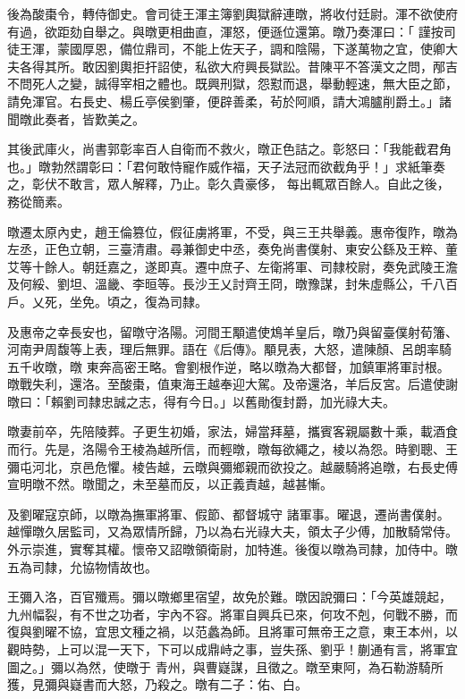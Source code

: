\begin{pinyinscope}
 後為酸棗令，轉侍御史。會司徒王渾主簿劉輿獄辭連暾，將收付廷尉。渾不欲使府有過，欲距劾自舉之。與暾更相曲直，渾怒，便遜位還第。暾乃奏渾曰：「
 謹按司徒王渾，蒙國厚恩，備位鼎司，不能上佐天子，調和陰陽，下遂萬物之宜，使卿大夫各得其所。敢因劉輿拒扞詔使，私欲大府興長獄訟。昔陳平不答漢文之問，邴吉不問死人之變，誠得宰相之體也。既興刑獄，怨懟而退，舉動輕速，無大臣之節，請免渾官。右長史、楊丘亭侯劉肇，便辟善柔，茍於阿順，請大鴻臚削爵土。」諸聞暾此奏者，皆歎美之。



 其後武庫火，尚書郭彰率百人自衛而不救火，暾正色詰之。彰怒曰：「我能截君角也。」暾勃然謂彰曰：「君何敢恃寵作威作福，天子法冠而欲截角乎！」求紙筆奏之，彰伏不敢言，眾人解釋，乃止。彰久貴豪侈，
 每出輒眾百餘人。自此之後，務從簡素。



 暾遷太原內史，趙王倫篡位，假征虜將軍，不受，與三王共舉義。惠帝復阼，暾為左丞，正色立朝，三臺清肅。尋兼御史中丞，奏免尚書僕射、東安公繇及王粹、董艾等十餘人。朝廷嘉之，遂即真。遷中庶子、左衛將軍、司隸校尉，奏免武陵王澹及何綏、劉坦、溫畿、李晅等。長沙王乂討齊王冏，暾豫謀，封朱虛縣公，千八百戶。乂死，坐免。頃之，復為司隸。



 及惠帝之幸長安也，留暾守洛陽。河間王顒遣使鴆羊皇后，暾乃與留臺僕射荀籓、河南尹周馥等上表，理后無罪。語在《后傳》。顒見表，大怒，遣陳顏、呂朗率騎五千收暾，暾
 東奔高密王略。會劉根作逆，略以暾為大都督，加鎮軍將軍討根。暾戰失利，還洛。至酸棗，值東海王越奉迎大駕。及帝還洛，羊后反宮。后遣使謝暾曰：「賴劉司隸忠誠之志，得有今日。」以舊勛復封爵，加光祿大夫。



 暾妻前卒，先陪陵葬。子更生初婚，家法，婦當拜墓，攜賓客親屬數十乘，載酒食而行。先是，洛陽令王棱為越所信，而輕暾，暾每欲繩之，棱以為怨。時劉聰、王彌屯河北，京邑危懼。棱告越，云暾與彌鄉親而欲投之。越嚴騎將追暾，右長史傅宣明暾不然。暾聞之，未至墓而反，以正義責越，越甚慚。



 及劉曜寇京師，以暾為撫軍將軍、假節、都督城守
 諸軍事。曜退，遷尚書僕射。越憚暾久居監司，又為眾情所歸，乃以為右光祿大夫，領太子少傅，加散騎常侍。外示崇進，實奪其權。懷帝又詔暾領衛尉，加特進。後復以暾為司隸，加侍中。暾五為司隸，允協物情故也。



 王彌入洛，百官殲焉。彌以暾鄉里宿望，故免於難。暾因說彌曰：「今英雄競起，九州幅裂，有不世之功者，宇內不容。將軍自興兵已來，何攻不剋，何戰不勝，而復與劉曜不協，宜思文種之禍，以范蠡為師。且將軍可無帝王之意，東王本州，以觀時勢，上可以混一天下，下可以成鼎峙之事，豈失孫、劉乎！蒯通有言，將軍宜圖之。」彌以為然，使暾于
 青州，與曹嶷謀，且徵之。暾至東阿，為石勒游騎所獲，見彌與嶷書而大怒，乃殺之。暾有二子：佑、白。




\end{pinyinscope}
